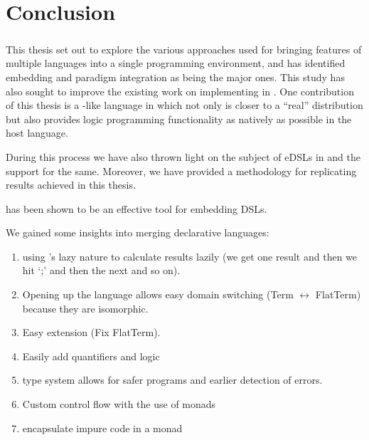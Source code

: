 \documentclass[thesis-solanki.tex]{subfiles}
\begin{document}
\chapter{Conclusion}\label{chap:conclusion}
\paragraph{}
This thesis set out to explore the various approaches used for bringing features of multiple languages into a single 
programming environment, and has identified embedding and paradigm integration as being the major ones. This study has also sought to improve
the existing work on implementing  in . One contribution of this thesis is a  
-like language in  which not only is closer to a ``real''  distribution but also provides 
logic programming functionality as natively as possible in the host language.

During this process we have also thrown light on the subject of eDSLs in  and the support for the same. Moreover, we
have provided a methodology for replicating results achieved in this thesis.

 has been shown to be an effective tool for embedding DSLs.




We gained some insights into merging declarative languages:
\begin{enumerate}
\item using 's lazy nature to calculate results lazily (we get one result and then we hit `;' and then the next and so on).

\item Opening up the language  allows easy domain switching (Term $\leftrightarrow$ FlatTerm) because they are isomorphic.

\item Easy extension (Fix FlatTerm).

\item Easily add quantifiers and logic

\item type system allows for safer programs and earlier detection of errors.

\item Custom control flow with the use of monads

\item encapsulate impure code in a monad
\end{enumerate}
\end{document}
